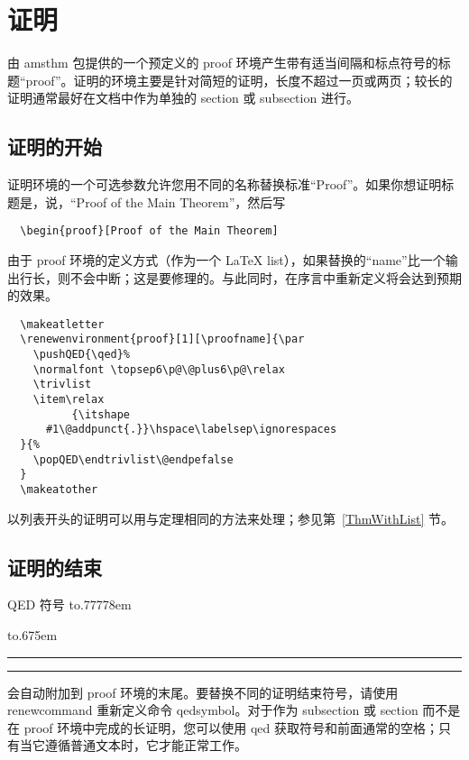 \documentclass[11pt,twoside,fontset=sikou,punct=kaiming]{ctexart}
\providecommand{\qq}[1]{“#1”}
\newcommand{\ntt}{%
  \ttfamily\mdseries\upshape%
}
\DeclareRobustCommand{\cn}[1]{{\ntt\bslchar#1}}
\DeclareRobustCommand{\pkg}[1]{{\ntt#1}}
\DeclareRobustCommand{\env}[1]{{\ntt#1}}
\providecommand{\qedsymbol}{\leavevmode
  \hbox to.77778em{%
  \hfil\vrule
  \vbox to.675em{\hrule width.6em\vfil\hrule}%
  \vrule\hfil}}
\def\latex/{{\protect\LaTeX}}
\begin{document}


\section{证明}

由 \pkg{amsthm} 包提供的一个预定义的 \env{proof} 环境产生带有适当间隔和标点符号的标题\qq{proof}。证明的环境主要是针对简短的证明，长度不超过一页或两页；较长的证明通常最好在文档中作为单独的 \cn{section} 或 \cn{subsection} 进行。

\subsection{证明的开始}

证明环境的一个可选参数允许您用不同的名称替换标准\qq{Proof}。如果你想证明标题是，说，\qq{Proof of the Main Theorem}，然后写
\begin{verbatim}
  \begin{proof}[Proof of the Main Theorem]
\end{verbatim}

由于 \env{proof} 环境的定义方式（作为一个 \latex/ list），如果替换的“name”比一个输出行长，则不会中断；这是要修理的。与此同时，在序言中重新定义将会达到预期的效果。
\begin{verbatim}
  \makeatletter
  \renewenvironment{proof}[1][\proofname]{\par
    \pushQED{\qed}%
    \normalfont \topsep6\p@\@plus6\p@\relax
    \trivlist
    \item\relax
          {\itshape
      #1\@addpunct{.}}\hspace\labelsep\ignorespaces
  }{%
    \popQED\endtrivlist\@endpefalse
  }
  \makeatother
\end{verbatim}

以列表开头的证明可以用与定理相同的方法来处理；参见第~\ref{ThmWithList} 节。

\subsection{证明的结束}

QED 符号 \qedsymbol{} 会自动附加到 \env{proof} 环境的末尾。要替换不同的证明结束符号，请使用 \cn{renewcommand} 重新定义命令 \cn{qedsymbol}。对于作为 subsection 或 section 而不是在 \env{proof} 环境中完成的长证明，您可以使用 \cn{qed} 获取符号和前面通常的空格；只有当它遵循普通文本时，它才能正常工作。
\end{document}
